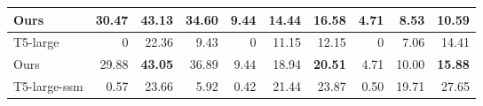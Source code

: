 \begin{table*}[ht]
{\begin{tabular}{lrrrrrrrrr}
    Ours        & 30.47                                                                  & \textbf{43.13}                                                   & 34.60                                                               & 9.44                                                                   & 14.44                                                            & \textbf{16.58}                                                      & 4.71                                                                   & 8.53                                                             & \textbf{10.59}                                                      \\ \hline
    T5-large               & 0                                                                      & 22.36                                                            & 9.43                                                                & 0                                                                      & 11.15                                                            & 12.15                                                               & 0                                                                      & 7.06                                                             & 14.41                                                               \\ 
    Ours       & 29.88                                                                  & \textbf{43.05}                                                   & 36.89                                                               & 9.44                                                                   & 18.94                                                            & \textbf{20.51}                                                      & 4.71                                                                   & 10.00                                                            & \textbf{15.88}                                                      \\ \hline
    T5-large-ssm           & 0.57                                                                   & 23.66                                                            & 5.92                                                                & 0.42                                                                   & 21.44                                                            & 23.87                                                               & 0.50                                                                   & 19.71                                                            & 27.65                                                               \\ 

\end{tabular}}
\end{table*}
